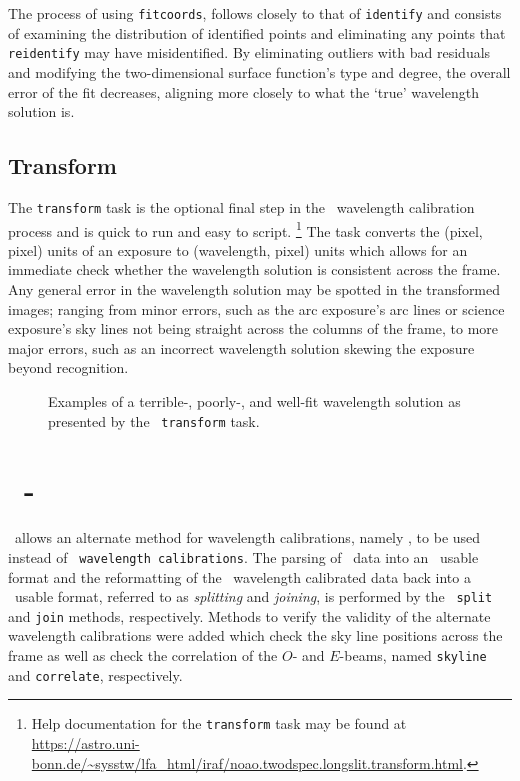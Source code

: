 The process of using \texttt{fitcoords}, follows closely to that of \texttt{identify} and consists of examining the distribution of identified points and eliminating any points that \texttt{reidentify} may have misidentified. By eliminating outliers with bad residuals and modifying the two-dimensional surface function's type and degree, the overall error of the fit decreases, aligning more closely to what the `true' wavelength solution is.

\subsection{Transform}

The \texttt{transform} task is the optional final step in the \iraf\ wavelength calibration process and is quick to run and easy to script.%
\footnote{Help documentation for the \texttt{transform} task may be found at \url{https://astro.uni-bonn.de/~sysstw/lfa_html/iraf/noao.twodspec.longslit.transform.html}.}
The task converts the (pixel, pixel) units of an exposure to (wavelength, pixel) units which allows for an immediate check whether the wavelength solution is consistent across the frame. Any general error in the wavelength solution may be spotted in the transformed images; ranging from minor errors, such as the arc exposure's arc lines or science exposure's sky lines not being straight across the columns of the frame, to more major errors, such as an incorrect wavelength solution skewing the exposure beyond recognition.

\begin{figure}[t]
    \centering
    \caption{Examples of a terrible-, poorly-, and well-fit wavelength solution as presented by the \iraf\ \texttt{transform} task.}
    \label{fig:iraf_tran_eg}
\end{figure}

\section[\stops]{\stops\ - } \label{sec:stops}

\stops\ allows an alternate method for wavelength calibrations, namely \iraf, to be used instead of \polsalt\ \texttt{wavelength calibrations}. The parsing of \polsalt\ data into an \iraf\ usable format and the reformatting of the \iraf\ wavelength calibrated data back into a \polsalt\ usable format, referred to as \textit{splitting} and \textit{joining}, is performed by the \stops\ \texttt{split} and \texttt{join} methods, respectively. Methods to verify the validity of the alternate wavelength calibrations were added which check the sky line positions across the frame as well as check the correlation of the $O$- and $E$-beams, named \texttt{skyline} and \texttt{correlate}, respectively.

